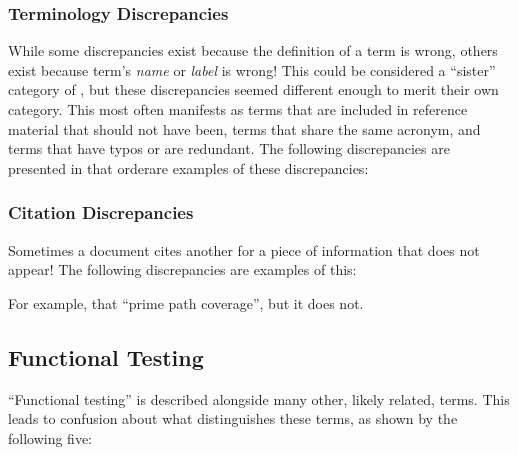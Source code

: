 \subsubsection{Terminology Discrepancies}
\label{terms}

While some discrepancies exist because the definition of a term is wrong,
others exist because term's \emph{name} or \emph{label} is wrong! This could be
considered a ``sister'' category of , but these
discrepancies seemed different enough to merit their own category. \ifnotpaper
    This most often manifests as terms that are included in reference material
    that should not have been, terms that share the same acronym, and terms
    that have typos or are redundant. \fi The following \ifnotpaper
    discrepancies are presented in that order\else are examples of these
    discrepancies\fi:



\subsubsection{Citation Discrepancies}
\label{cites}

Sometimes a document cites another for a piece of information that does not
appear! \ifnotpaper
    The following discrepancies are examples of this:
    
\else
    For example, \citet[p.~184]{DoğanEtAl2014}  that
    \citet{SakamotoEtAl2013}  ``prime path coverage'',
    but it does not.
\fi


\subsection{Functional Testing}
\label{func-test-discrep}

``Functional testing'' is described alongside many other, likely related,
terms. This leads to confusion about what distinguishes these terms, as shown
by the following five:

